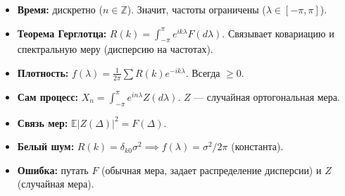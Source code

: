\documentclass[
  11pt,
  a4paper,
]{article}
\providecommand{\tightlist}{%
  \setlength{\itemsep}{0pt}\setlength{\parskip}{0pt}}
\begin{document}
\begin{itemize}
\tightlist
\item
  \textbf{Время:} дискретно (\(n \in \mathbb{Z}\)). Значит, частоты
  ограничены (\(\lambda \in [-\pi, \pi]\)).
\item
  \textbf{Теорема Герглотца:}
  \(R(k) = \int_{-\pi}^{\pi} e^{i k \lambda} F(d\lambda)\). Связывает
  ковариацию и спектральную меру (дисперсию на частотах).
\item
  \textbf{Плотность:}
  \(f(\lambda) = \frac{1}{2\pi} \sum R(k) e^{-i k \lambda}\). Всегда
  \(\ge 0\).
\item
  \textbf{Сам процесс:}
  \(X_n = \int_{-\pi}^{\pi} e^{i n \lambda} Z(d\lambda)\). \(Z\) ---
  случайная ортогональная мера.
\item
  \textbf{Связь мер:} \(\mathbb E|Z(\Delta)|^2 = F(\Delta)\).
\item
  \textbf{Белый шум:}
  \(R(k) = \delta_{k0} \sigma^2 \implies f(\lambda) = \sigma^2 / 2\pi\)
  (константа).
\item
  \textbf{Ошибка:} путать \(F\) (обычная мера, задает распределение
  дисперсии) и \(Z\) (случайная мера).
\end{itemize}

\newpage
\end{document}
